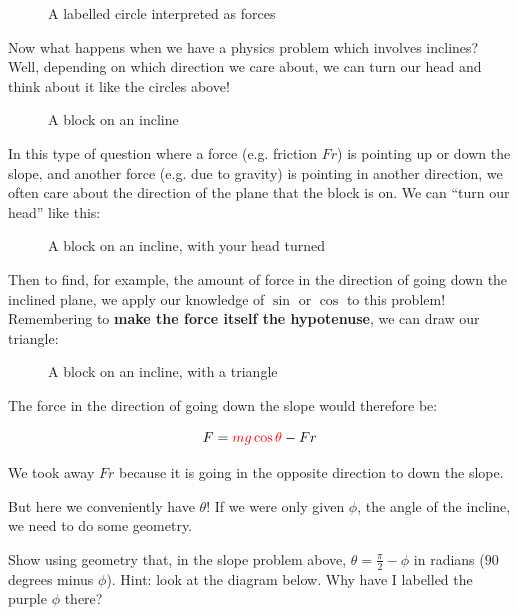 \newpage
\begin{figure}[H]
    \centering
    \caption{A labelled circle interpreted as forces}
    \label{fig:circle-as-force}
\end{figure}

Now what happens when we have a physics problem which involves inclines? Well, depending on which direction we care about, we can turn our head and think about it like the circles above!

\begin{figure}[H]
    \centering
    \caption{A block on an incline}
    \label{fig:block-incline-basic}
\end{figure}

In this type of question where a force (e.g. friction $Fr$) is pointing up or down the slope, and another force (e.g. due to gravity) is pointing in another direction, 
we often care about the direction of the plane that the block is on. We can ``turn our head'' like this:

\newpage
\begin{figure}[H]
    \centering
    \caption{A block on an incline, with your head turned}
    \label{fig:block-incline-basic-rotated}
\end{figure}

Then to find, for example, the amount of force in the direction of going down the inclined plane, we apply our knowledge of $\sin$ or $\cos$ to this problem! 
Remembering to \textbf{make the force itself the hypotenuse}, we can draw our triangle:

\begin{figure}[H]
    \centering
    \caption{A block on an incline, with a triangle}
    \label{fig:block-incline-basic-triangle}
\end{figure}

The force in the direction of going down the slope would therefore be:

\[ F = \textcolor{red}{mg \cos \theta} - Fr\]

We took away $Fr$ because it is going in the opposite direction to down the slope.

But here we conveniently have $\theta$! If we were only given $\phi$, the angle of the incline, we need to do some geometry.

\newpage
\begin{exercise}
Show using geometry that, in the slope problem above, $\theta = \frac{\pi}{2} - \phi$ in radians ($90$ degrees minus $\phi$). Hint: look at the diagram below. Why have I labelled the purple $\phi$ there?
\end{exercise}

